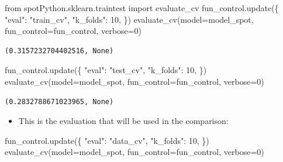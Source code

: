\documentclass[
  letterpaper,
  DIV=11,
  numbers=noendperiod]{scrreprt}
\newenvironment{Shaded}{\begin{snugshade}}{\end{snugshade}}
\newcommand{\DecValTok}[1]{\textcolor[rgb]{0.68,0.00,0.00}{#1}}
\newcommand{\ImportTok}[1]{\textcolor[rgb]{0.00,0.46,0.62}{#1}}
\newcommand{\NormalTok}[1]{\textcolor[rgb]{0.00,0.23,0.31}{#1}}
\newcommand{\OperatorTok}[1]{\textcolor[rgb]{0.37,0.37,0.37}{#1}}
\newcommand{\StringTok}[1]{\textcolor[rgb]{0.13,0.47,0.30}{#1}}
\providecommand{\tightlist}{%
  \setlength{\itemsep}{0pt}\setlength{\parskip}{0pt}}\usepackage{longtable,booktabs,array}
\begin{document}
\begin{Shaded}
\begin{Highlighting}[]
\ImportTok{from}\NormalTok{ spotPython.sklearn.traintest }\ImportTok{import}\NormalTok{ evaluate\_cv}
\NormalTok{fun\_control.update(\{}
     \StringTok{"eval"}\NormalTok{: }\StringTok{"train\_cv"}\NormalTok{,}
     \StringTok{"k\_folds"}\NormalTok{: }\DecValTok{10}\NormalTok{,}
\NormalTok{\})}
\NormalTok{evaluate\_cv(model}\OperatorTok{=}\NormalTok{model\_spot, fun\_control}\OperatorTok{=}\NormalTok{fun\_control, verbose}\OperatorTok{=}\DecValTok{0}\NormalTok{)}
\end{Highlighting}
\end{Shaded}

\begin{verbatim}
(0.3157232704402516, None)
\end{verbatim}

\begin{Shaded}
\begin{Highlighting}[]
\NormalTok{fun\_control.update(\{}
     \StringTok{"eval"}\NormalTok{: }\StringTok{"test\_cv"}\NormalTok{,}
     \StringTok{"k\_folds"}\NormalTok{: }\DecValTok{10}\NormalTok{,}
\NormalTok{\})}
\NormalTok{evaluate\_cv(model}\OperatorTok{=}\NormalTok{model\_spot, fun\_control}\OperatorTok{=}\NormalTok{fun\_control, verbose}\OperatorTok{=}\DecValTok{0}\NormalTok{)}
\end{Highlighting}
\end{Shaded}

\begin{verbatim}
(0.2832788671023965, None)
\end{verbatim}

\begin{itemize}
\tightlist
\item
  This is the evaluation that will be used in the comparison:
\end{itemize}

\begin{Shaded}
\begin{Highlighting}[]
\NormalTok{fun\_control.update(\{}
     \StringTok{"eval"}\NormalTok{: }\StringTok{"data\_cv"}\NormalTok{,}
     \StringTok{"k\_folds"}\NormalTok{: }\DecValTok{10}\NormalTok{,}
\NormalTok{\})}
\NormalTok{evaluate\_cv(model}\OperatorTok{=}\NormalTok{model\_spot, fun\_control}\OperatorTok{=}\NormalTok{fun\_control, verbose}\OperatorTok{=}\DecValTok{0}\NormalTok{)}
\end{Highlighting}
\end{Shaded}
\end{document}
